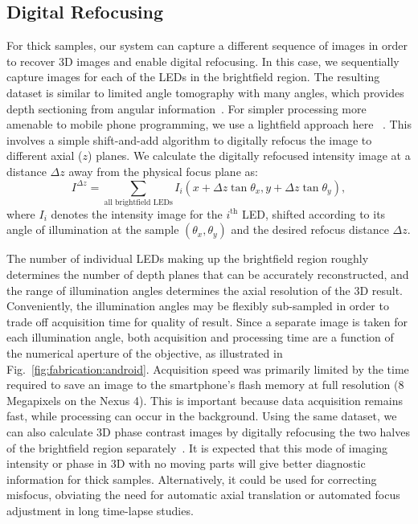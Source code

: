 \subsection{Digital Refocusing}
For thick samples, our system can capture a different sequence of images in order to recover 3D images and enable digital refocusing. In this case, we sequentially capture images for each of the LEDs in the brightfield region. The resulting dataset is similar to limited angle tomography with many angles, which provides depth sectioning from angular information~\cite{Kak:1988fk}. For simpler processing more amenable to mobile phone programming, we use a lightfield approach here ~\cite{Ng2005,Zheng2011}. This involves a simple shift-and-add algorithm to digitally refocus the image to different axial ($z$) planes. We calculate the digitally refocused intensity image at a distance $\Delta z$ away from the physical focus plane as:
\begin{equation}
I^{\Delta z} = \sum_{\text{all brightfield LEDs}}I_i(x+\Delta z\tan{\theta_x}, y+\Delta z\tan{\theta_y}),
\label{I_refocus}
\end{equation}
where $I_i$ denotes the intensity image for the $i^{\text{th}}$ LED, shifted according to its angle of illumination at the sample $(\theta_x,\theta_y)$ and the desired refocus distance $\Delta z$.

The number of individual LEDs making up the brightfield region roughly determines the number of depth planes that can be accurately reconstructed, and the range of illumination angles determines the axial resolution of the 3D result. Conveniently, the illumination angles may be flexibly sub-sampled in order to trade off acquisition time for quality of result. Since a separate image is taken for each illumination angle, both acquisition and processing time are a function of the numerical aperture of the objective, as illustrated in Fig.~\ref{fig:fabrication:android}. Acquisition speed was primarily limited by the time required to save an image to the smartphone’s flash memory at full resolution (8 Megapixels on the Nexus 4). This is important because data acquisition remains fast, while processing can occur in the background. Using the same dataset, we can also calculate 3D phase contrast images by digitally refocusing the two halves of the brightfield region separately~\cite{Tian14}. It is expected that this mode of imaging intensity or phase in 3D with no moving parts will give better diagnostic information for thick samples. Alternatively, it could be used for correcting misfocus, obviating the need for automatic axial translation or automated focus adjustment in long time-lapse studies.

